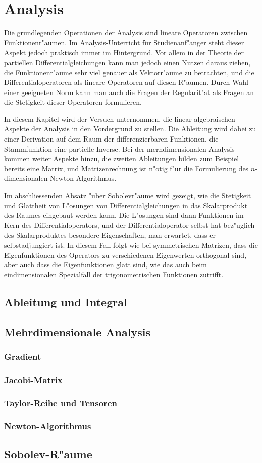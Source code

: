 %
%
%
\chapter{Analysis}
Die grundlegenden Operationen der Analysis sind lineare Operatoren
zwischen Funktionenr"aumen.
Im Analysis-Unterricht für Studienanf"anger steht dieser Aspekt jedoch
praktisch immer im Hintergrund.
Vor allem in der Theorie der partiellen Differentialgleichungen 
kann man jedoch einen Nutzen daraus ziehen, die Funktionenr"aume
sehr viel genauer als Vektorr"aume zu betrachten, und die
Differentialoperatoren als lineare Operatoren auf diesen R"aumen.
Durch Wahl einer geeigneten Norm kann man auch die Fragen der
Regularit"at als Fragen an die Stetigkeit dieser Operatoren
formulieren.

In diesem Kapitel wird der Versuch unternommen, die linear algebraischen
Aspekte der Analysis in den Vordergrund zu stellen.
Die Ableitung wird dabei zu einer Derivation auf dem Raum der
differenzierbaren Funktionen, die Stammfunktion eine partielle
Inverse.
Bei der merhdimensionalen Analysis kommen weiter Aspekte hinzu, die
zweiten Ableitungen bilden zum Beispiel bereits eine Matrix,
und Matrizenrechnung ist n"otig f"ur die Formulierung des
$n$-dimensionalen Newton-Algorithmus.

Im abschliessenden Absatz "uber Sobolevr"aume wird gezeigt, wie
die Stetigkeit und Glattheit von L"osungen von Differentialgleichungen
in das Skalarprodukt des Raumes eingebaut werden kann.
Die L"osungen sind dann Funktionen im Kern des Differentialoperators,
und der Differentialoperator selbst hat bez"uglich des Skalarproduktes
besondere Eigenschaften, man erwartet, dass er selbstadjungiert ist.
In diesem Fall folgt wie bei symmetrischen Matrizen, dass die
Eigenfunktionen des Operators zu verschiedenen Eigenwerten orthogonal 
sind, aber auch dass die Eigenfunktionen glatt sind, wie das auch
beim eindimensionalen Spezialfall der trigonometrischen Funktionen
zutrifft.

\section{Ableitung und Integral}

\section{Mehrdimensionale Analysis}
\subsection{Gradient}
\subsection{Jacobi-Matrix}
\subsection{Taylor-Reihe und Tensoren}
\subsection{Newton-Algorithmus}

\section{Sobolev-R"aume}

